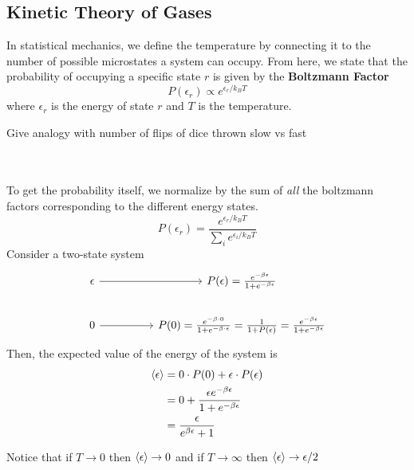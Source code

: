\documentclass[11pt]{article}
\begin{document}
\subsection*{Kinetic Theory of Gases}
In statistical mechanics, we define the temperature by connecting it to the number of possible microstates a system can occupy. From here, we state that the probability of occupying a specific state $r$ is given by the \textbf{Boltzmann Factor}
\[ P(\epsilon_r) \propto e^{\epsilon_r / k_B T} \] where $\epsilon_r$ is the energy of state $r$ and $T$ is the temperature.
\\
\begin{note}
  {Give analogy with number of flips of dice thrown slow vs fast}
\end{note}
\\
\\
To get the probability itself, we normalize by the sum of \emph{all} the boltzmann factors corresponding to the different energy states.
\[ P(\epsilon_r) = \frac{e^{\epsilon_r / k_B T}}{\sum_{i} e^{\epsilon_i / k_B T} } \] Consider a two-state system
\[\begin{tikzcd}
	\epsilon && {P(\epsilon) = \frac{e^{-\beta\epsilon}}{1 + e^{-\beta\epsilon}}} \\
	0 && {P(0) = \frac{e^{-\beta \cdot 0}}{1 + e^{-\beta \cdot \epsilon}} = \frac{1}{1 + P(\epsilon)} = \frac{e^{-\beta\epsilon}}{1 + e^{-\beta\epsilon}}}
	\arrow[from=1-1, to=1-3]
	\arrow[from=2-1, to=2-3]
\end{tikzcd}\]
Then, the expected value of the energy of the system is 
\begin{align*}
  \langle \epsilon \rangle &= 0 \cdot P(0) + \epsilon \cdot P(\epsilon) \\
  &= 0 + \frac{\epsilon e^{-\beta \epsilon}}{1 + e^{-\beta \epsilon}} \\
  &= \frac{\epsilon}{e^{\beta \epsilon} + 1}
\end{align*}

Notice that if $T \rightarrow 0$ then $\langle \epsilon \rangle \rightarrow 0$ and if $T \rightarrow \infty$ then $\langle \epsilon \rangle \rightarrow \epsilon / 2$
\end{document}

